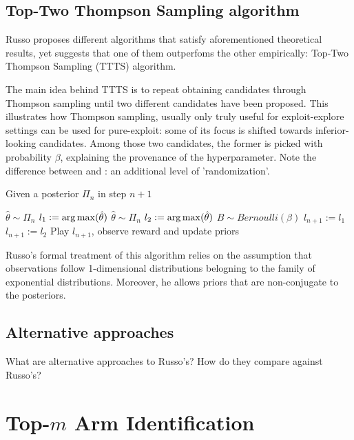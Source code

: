\subsection{Top-Two Thompson Sampling algorithm}

Russo proposes different algorithms that satisfy aforementioned theoretical results, yet suggests that one of them outperfoms the other empirically: Top-Two Thompson Sampling (TTTS) algorithm.

The main idea behind TTTS is to repeat obtaining candidates through Thompson sampling until two different candidates have been proposed. This illustrates how Thompson sampling, usually only truly useful for exploit-explore settings can be used for pure-exploit: some of its focus is shifted towards inferior-looking candidates. Among those two candidates, the former is picked with probability $\beta$, explaining the provenance of the hyperparameter. Note the difference between  and : an additional level of 'randomization'.

\begin{algorithm}[H]
    \caption{Given a posterior $\Pi_n$ in step $n + 1$}
    \label{alg:TTTS}
  \begin{algorithmic}
    \State $\hat{\theta} \sim \Pi_n$
    \State $l_1 := \operatorname*{arg\,max}(\hat{\theta})$
    \Repeat
      \State $\hat{\theta} \sim \Pi_n$
      \State $l_2 := \operatorname*{arg\,max}(\hat{\theta})$
    \State $B \sim Bernoulli(\beta)$
      \State $l_{n+1} := l_1$
    \Else
      \State $l_{n+1} := l_2$
    \EndIf
    \State Play $l_{n+1}$, observe reward and update priors
  \end{algorithmic}
\end{algorithm}

Russo's formal treatment of this algorithm relies on the assumption that observations follow 1-dimensional distributions belogning to the family of exponential distributions. Moreover, he allows priors that are non-conjugate to the posteriors.

\subsection{Alternative approaches}
What are alternative approaches to Russo's?
How do they compare against Russo's?

\section{Top-$m$ Arm Identification}

